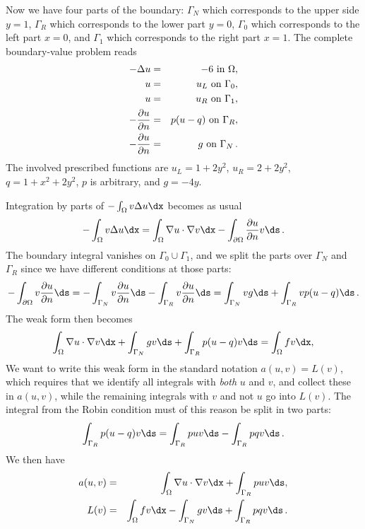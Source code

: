 Now we have four parts of the boundary: $\Gamma_N$ which corresponds to
the upper side $y=1$, $\Gamma_R$ which corresponds to the lower part
$y=0$, $\Gamma_0$ which corresponds to the left part $x=0$, and
$\Gamma_1$ which corresponds to the right part $x=1$. The
complete boundary-value problem reads
\begin{eqnarray} 
    - \Delta u &=& -6 \mbox{ in } \Omega, \label{langtangen:poisson:2D:DN3}\\
    u &=& u_L \mbox{ on } \Gamma_0, \label{langtangen:poisson:2D:DN3:bc1}\\
    u &=& u_R \mbox{ on } \Gamma_1, \label{langtangen:poisson:2D:DN3:bc2}\\
    - {\partial u\over\partial n} &=& p(u-q) \mbox{ on } \Gamma_R, 
    \label{langtangen:poisson:2D:DN3:bc3}\\
    - {\partial u\over\partial n} &=& g \mbox{ on } \Gamma_N\thinspace .
    \label{langtangen:poisson:2D:DN3:bc4}
\end{eqnarray}
The involved prescribed functions are $u_L= 1 + 2y^2$,
$u_R = 2 + 2y^2$, $q=1+x^2+2y^2$, $p$ is arbitrary, and $g=-4y$.

Integration by parts of $-\int_\Omega v\Delta u\dx$ becomes
as usual
\[
 -\int_\Omega v\Delta u \dx
= \int_\Omega\nabla u\cdot \nabla v\dx - \int_{\partial\Omega}{\partial u\over
\partial n}v\ds\langtangenep
\]
The boundary integral vanishes on $\Gamma_0\cup\Gamma_1$, and
we split the parts over $\Gamma_N$ and $\Gamma_R$ since we have
different conditions at those parts:
\[
- \int_{\partial\Omega}v{\partial u\over
\partial n}\ds
=
-\int_{\Gamma_N}v{\partial u\over
\partial n}\ds -
\int_{\Gamma_R}v{\partial u\over
\partial n}\ds
= \int_{\Gamma_N}vg\ds +
\int_{\Gamma_R}vp(u-q)\ds\langtangenep
\]
The weak form then becomes
\[
\int_{\Omega} \nabla u\cdot \nabla v \dx +
\int_{\Gamma_N} gv\ds + \int_{\Gamma_R}p(u-q)v\ds
= \int_{\Omega} fv \dx,
\]
We want to write this weak form in the standard
notation $a(u,v)=L(v)$, which
requires that we identify all integrals with \emph{both} $u$ and $v$,
and collect these in $a(u,v)$, while the remaining integrals with
$v$ and not $u$ go
into $L(v)$.
The integral from the Robin condition must of this reason be split in two
parts:
\[ \int_{\Gamma_R}p(u-q)v\ds
= \int_{\Gamma_R}puv\ds - \int_{\Gamma_R}pqv\ds\langtangenep
\]
We then have
\begin{eqnarray}
a(u, v) &=& \int_{\Omega} \nabla u\cdot \nabla v \dx
+ \int_{\Gamma_R}puv\ds,
\label{langtangen:poisson:2D:DN3:var:a}\\
L(v) &=& \int_{\Omega} fv \dx -
\int_{\Gamma_N} g v\ds + \int_{\Gamma_R}pqv\ds\langtangenep
\label{langtangen:poisson:2D:DN3:var:L}
\end{eqnarray}

